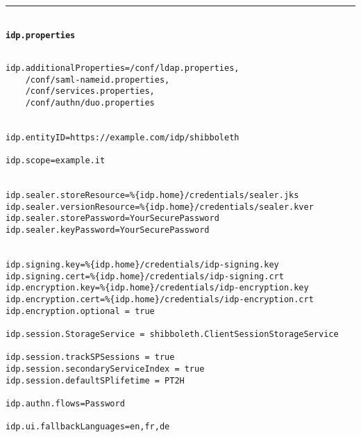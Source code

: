 \noindent\rule{14cm}{0.4pt}\\
\textbf{\texttt{idp.properties}}
\begin{verbatim}

idp.additionalProperties=/conf/ldap.properties, 
    /conf/saml-nameid.properties, 
    /conf/services.properties, 
    /conf/authn/duo.properties


idp.entityID=https://example.com/idp/shibboleth

idp.scope=example.it


idp.sealer.storeResource=%{idp.home}/credentials/sealer.jks
idp.sealer.versionResource=%{idp.home}/credentials/sealer.kver
idp.sealer.storePassword=YourSecurePassword
idp.sealer.keyPassword=YourSecurePassword


idp.signing.key=%{idp.home}/credentials/idp-signing.key
idp.signing.cert=%{idp.home}/credentials/idp-signing.crt
idp.encryption.key=%{idp.home}/credentials/idp-encryption.key
idp.encryption.cert=%{idp.home}/credentials/idp-encryption.crt
idp.encryption.optional = true

idp.session.StorageService = shibboleth.ClientSessionStorageService

idp.session.trackSPSessions = true
idp.session.secondaryServiceIndex = true
idp.session.defaultSPlifetime = PT2H

idp.authn.flows=Password

idp.ui.fallbackLanguages=en,fr,de

\end{verbatim}

